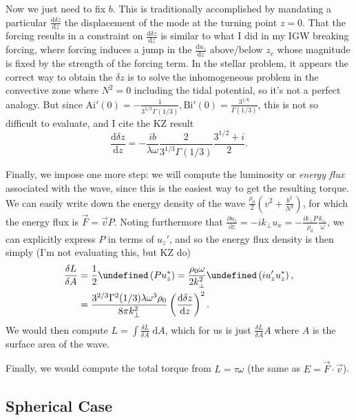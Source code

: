 \documentclass[11pt,
        usenames, %
        dvipsnames %
    ]{article}
\newcommand*{\rd}[2]{\frac{\mathrm{d}#1}{\mathrm{d}#2}}
\newcommand*{\pd}[2]{\frac{\partial#1}{\partial#2}}
\newcommand*{\p}[1]{\left(#1\right)}
\let\Re\undefined
\DeclareMathOperator{\Re}{Re}
\begin{document}
Now we just need to fix $b$. This is traditionally accomplished by mandating a
particular $\rd{\delta z}{z}$ the displacement of the mode at the turning point
$z = 0$. That the forcing results in a constraint on $\rd{\delta z}{z}$ is
similar to what I did in my IGW breaking forcing, where forcing induces a jump
in the $\rd{u_z}{z}$ above/below $z_c$ whose magnitude is fixed by the strength
of the forcing term. In the stellar problem, it appears the correct way to
obtain the $\delta z$ is to solve the inhomogeneous problem in the convective
zone where $N^2 = 0$ including the tidal potential, so it's not a perfect
analogy. But since $\mathrm{Ai}'(0) = -\frac{1}{3^{1/3}\Gamma(1/3)},
\mathrm{Bi}'(0) = \frac{3^{1/6}}{\Gamma(1/3)}$, this is not so difficult to
evaluate, and I cite the KZ result
\begin{equation}
    \rd{\delta z}{z} = -\frac{ib}{\lambda \omega}\frac{2}{3^{1/3}\Gamma(1/3)}
        \frac{3^{1/2} + i}{2}.
\end{equation}

Finally, we impose one more step: we will compute the luminosity or \emph{energy
flux} associated with the wave, since this is the easiest way to get the
resulting torque. We can easily write down the energy density of the wave
$\frac{\rho_0}{2}\p{v^2 + \frac{b^2}{N^2}}$, for which the energy flux is
$\vec{F} = \vec{v}P$. Noting furthermore that $\pd{u_z}{z} = -ik_\perp u_x =
-\frac{ik_\perp P}{\rho_0}\frac{k_\perp }{\omega}$, we can explicitly express
$P$ in terms of $u_z'$, and so the energy flux density is then simply (I'm not
evaluating this, but KZ do)
\begin{align}
    \frac{\delta L}{\delta A} &= \frac{1}{2}\Re\p{P u_z^*}
            = \frac{\rho_0 \omega}{2k_\perp^2} \Re\p{iu_z'u_z^*},\\
        &= \frac{3^{2/3}\Gamma^2(1/3) \lambda \omega^3 \rho_0}{8\pi k_\perp^2}
            \p{\rd{\delta z}{z}}^2.
\end{align}
We would then compute $L = \int \frac{\delta L}{\delta A}\;\mathrm{d}A$, which
for us is just $\frac{\delta L}{\delta A}A$ where $A$ is the surface area of the
wave.

Finally, we would compute the total torque from $L = \tau \omega$ (the same
as $E = \vec{F} \cdot \vec{v}$).

\subsection{Spherical Case}
\end{document}
